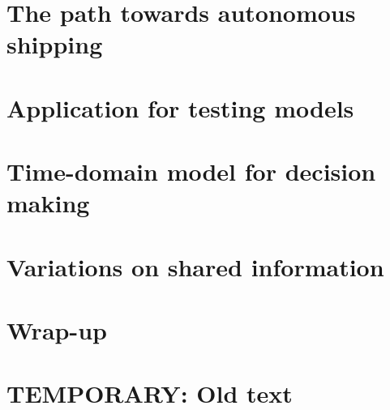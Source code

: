 \documentclass[a4paper,11pt,oneside]{book}
\begin{document}
\frontmatter


\makeCover %

\listoftodos[Notes]
\clearpage





\clearpage
\setcounter{tocdepth}{1}
\tableofcontents
\clearpage

\mainmatter



\part{The path towards autonomous shipping}





\part{Application for testing models}





\part{Time-domain model for decision making}







\part{Variations on shared information}







\part{Wrap-up}



\backmatter

\part{TEMPORARY: Old text}








\end{document}
